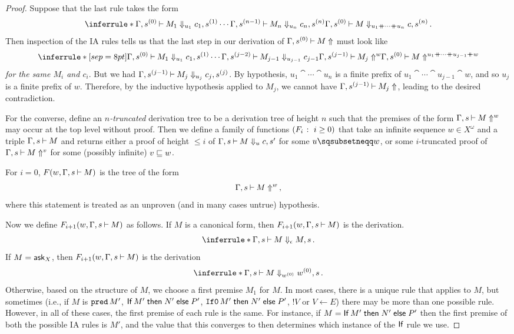 \documentclass{article}
\begin{document}
\begin{proof}
  Suppose that the last rule takes the form
  \[
    \inferrule*{\Gamma,s^{(0)}\ts M_1\converges_{u_1} c_1,s^{(1)} \\ \cdots \\ \Gamma,s^{(n-1)}\ts M_n\converges_{u_n} c_n,s^{(n)}}
    {\Gamma,s^{(0)} \ts M \converges_{u_1\cat \cdots\cat u_n} c,s^{(n)}}\,.
    \]
  Then inspection of the IA rules tells us that the last step in our derivation of $\Gamma,s^{(0)} \mathbin{\vdash} M\Uparrow$ must look like
  \[
    \inferrule*[sep=8pt]{\Gamma,s^{(0)}\ts M_1 \converges_{u_1} c_1,s^{(1)} \\ \cdots \\ \Gamma,s^{(j-2)} \ts M_{j-1} \converges_{u_{j-1}} c_{j-1} \\ \Gamma,s^{(j-1)}\ts M_j\diverges^w}
    {\Gamma,s^{(0)} \ts M \diverges^{u_1\cat \cdots \cat u_{j-1}\cat w}}
    \]
  \emph{for the same $M_i$ and $c_i$}.
  But we had $\Gamma,s^{(j-1)}\mathbin{\vdash} M_j\Downarrow_{u_j} c_j,s^{(j)}$.  
  By hypothesis, $u_1\cat \cdots \cat u_n$ is a finite prefix of $u_1 \cat \cdots \cat u_{j-1} \cat w$, and so $u_j$ is a finite prefix of $w$.  
  Therefore, by the inductive hypothesis applied to $M_j$, we cannot have $\Gamma,s^{(j-1)}\mathbin{\vdash} M_j\Uparrow$, leading to the desired contradiction.

  For the converse, define an \emph{$n$-truncated} derivation tree to be a derivation tree of height $n$ such that the premises of the form $\Gamma,s\mathbin{\vdash} M\Uparrow^w$ may occur at the top level without proof.  
  Then we define a family of functions $(F_i \;\colon\; i \ge 0)$ that take an infinite sequence $w\in X^\omega$ and a triple $\Gamma,s\mathbin{\vdash} M$ and returns either a proof of height $\le i$ of $\Gamma,s\mathbin{\vdash} M\Downarrow_u c,s'$ for some $u\pprefix w$, or some $i$-truncated proof of $\Gamma,s\mathbin{\vdash} M\Uparrow^v$ for some (possibly infinite) $v\sqsubseteq w$.

  For $i=0$, $F(w,\Gamma,s\mathbin{\vdash} M)$ is the tree of the form
  \[
    \Gamma,s\mathbin{\vdash} M\Uparrow^w\,,
    \]
  where this statement is treated as an unproven (and in many cases untrue) hypothesis.

  Now we define $F_{i+1}(w,\Gamma,s\mathbin{\vdash} M)$ as follows.  
  If $M$ is a canonical form, then $F_{i+1}(w,\Gamma,s\mathbin{\vdash} M)$ is the derivation.
  \[
    \inferrule*{ }{\Gamma,s\ts M\converges_\epsilon M,s}\,.
    \]
  If $M=\operatorname{{\mathsf{ask}}}_X$, then $F_{i+1}(w,\Gamma,s\mathbin{\vdash} M)$ is the derivation
  \[
    \inferrule*{ }{\Gamma,s\ts M\converges_{w^{(0)}} w^{(0)},s}\,.
    \]
  Otherwise, based on the structure of $M$, we choose a first premise $M_1$ for $M$.  
  In most cases, there is a unique \IAX rule that applies to $M$, but sometimes (i.e., if $M$ is $\operatorname{{\mathtt{pred}}} M'$, $\operatorname{\mathsf{If}} M' \mathrel{\mathsf{then}} N' \mathrel{\mathsf{else}} P'$, $\operatorname{{\mathtt{If0}}} M' \mathrel{\mathsf{then}} N' \mathrel{\mathsf{else}} P'$, $!V$ or $V\gets E$) there may be more than one possible rule.  
  However, in all of these cases, the first premise of each rule is the same.  
  For instance, if $M=\operatorname{\mathsf{If}} M' \mathrel{\mathsf{then}} N' \mathrel{\mathsf{else}} P'$ then the first premise of both the possible IA rules is $M'$, and the value that this converges to then determines which instance of the $\operatorname{\mathsf{If}}$ rule we use.


\end{proof}
\end{document}
